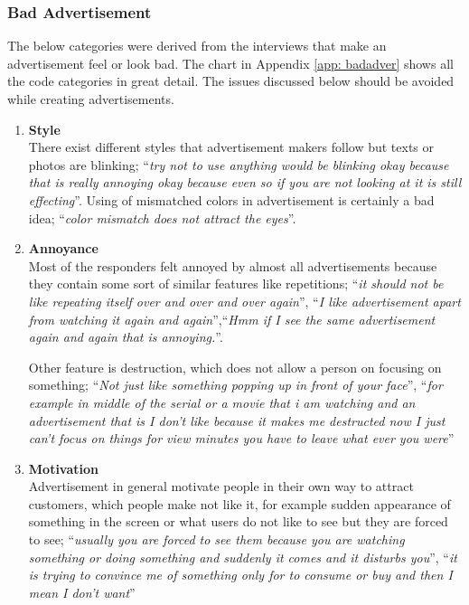 


\subsubsection{Bad Advertisement}
The below categories were derived from the interviews that make an advertisement feel or look bad. The chart in Appendix \ref{app: badadver} shows all the code categories in great detail. The issues discussed below should be avoided while creating advertisements.

\begin{enumerate}
\item \textbf{Style} \\
There exist different styles that advertisement makers follow but texts or photos are blinking; ``\emph{try not to use anything would be blinking okay because that is really annoying okay because even so if you are not looking at it is still effecting}''. Using of mismatched colors in advertisement is certainly a bad idea; ``\emph{color mismatch does not attract the eyes}''.

\item \textbf{Annoyance} \\
Most of the responders felt annoyed by almost all advertisements because they contain some sort of similar features like repetitions; ``\emph{it should not be like repeating itself over and over and over again}'', ``\emph{I like advertisement apart from watching it again and again}'',``\emph{Hmm if I see the same advertisement again and again that is annoying.}''. 

Other feature is destruction, which does not allow a person on focusing on something; ``\emph{Not just like something popping up in front of your face}'', ``\emph{for example in middle of the serial or a movie that i am watching and an advertisement that is I don't like because it makes me destructed now I just can't focus on things for view minutes you have to leave what ever you were}''

\item \textbf{Motivation} \\
Advertisement in general motivate people in their own way to attract customers, which people make not like it, for example sudden appearance of something in the screen or what users do not like to see but they are forced to see; ``\emph{usually you are forced to see them because you are watching something or doing something and suddenly it comes and it disturbs you}'', ``\emph{it is trying to convince me of something only for to consume or buy and then I mean I don't want}''


\end{enumerate}
